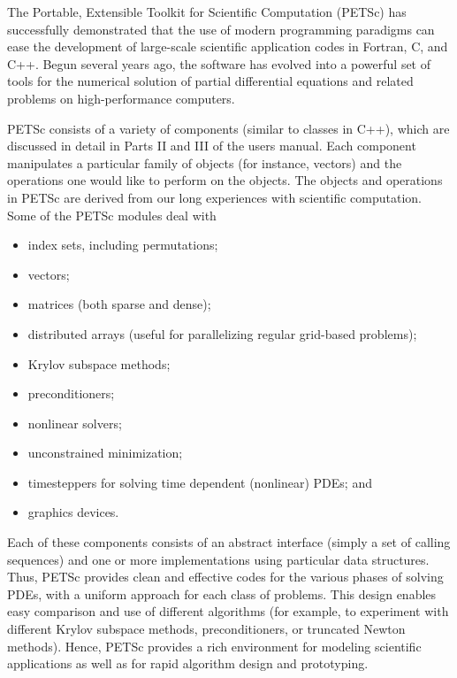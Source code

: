 
%
%
%

The Portable, Extensible Toolkit for Scientific Computation (PETSc)
has successfully demonstrated that the use of modern programming
paradigms can ease the development of large-scale scientific
application codes in Fortran, C, and C++.  Begun several years ago,
the software has evolved into a powerful set of tools for the
numerical solution of partial differential equations and related problems 
on high-performance computers.

PETSc consists of a variety of components (similar to classes in C++),
which are discussed in detail in Parts II and III of the users manual.
Each component manipulates a particular family of objects (for instance,
vectors) and the operations one would like to perform on the objects.
The objects and operations in PETSc are derived from our long 
experiences with scientific computation. Some of the PETSc modules deal with 
\begin{itemize} 
\item index sets, including permutations;
\item vectors;
\item matrices (both sparse and dense);
\item distributed arrays (useful for parallelizing regular grid-based 
      problems);
\item Krylov subspace methods;
\item preconditioners;
\item nonlinear solvers;
\item unconstrained minimization;
\item timesteppers for solving time dependent (nonlinear) PDEs; and
\item graphics devices.
\end{itemize}
Each of these components consists of an abstract interface 
(simply a set of calling sequences) and one or more implementations 
using particular data structures. Thus, PETSc provides clean and 
effective codes for the various phases of solving PDEs, with a uniform 
approach for each class of problems.  This design
enables easy comparison and use of different algorithms (for example,
to experiment with different Krylov subspace methods, preconditioners,
or truncated Newton methods).
Hence, PETSc provides a rich environment for modeling scientific
applications as well as for rapid algorithm design and prototyping.

